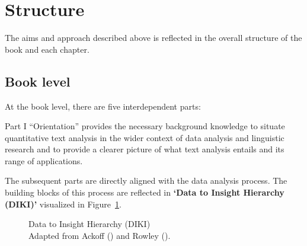 \documentclass[
  letterpaper,
]{latex/krantz}
\theoremstyle{definition}
\theoremstyle{remark}
\begin{document}
\section*{Structure}\label{sec-preface-structure}


The aims and approach described above is reflected in the overall
structure of the book and each chapter.

\subsection*{Book level}\label{sec-preface-structure-book}

At the book level, there are five interdependent parts:

Part I ``Orientation'' provides the necessary background knowledge to
situate quantitative text analysis in the wider context of data analysis
and linguistic research and to provide a clearer picture of what text
analysis entails and its range of applications.

The subsequent parts are directly aligned with the data analysis
process. The building blocks of this process are reflected in
\textbf{`Data to Insight Hierarchy
(DIKI)'} visualized in Figure~\ref{fig-diki-hierarchy}.

\begin{figure}[!htb]


\caption{\label{fig-diki-hierarchy}Data to Insight Hierarchy (DIKI)\\
Adapted from Ackoff () and Rowley
().}

\end{figure}%
\end{document}
